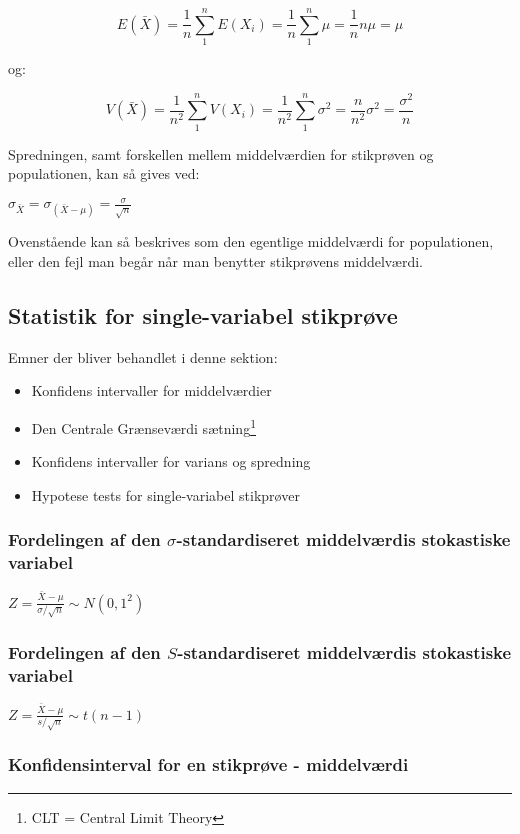 \documentclass{article}
\newcommand{\mellemrum}{\vspace{2 ex}}
\newcommand{\cent}[1]{ \mellemrum \begin{center} #1\end{center} \mellemrum }
\newcommand{\centL}[1]{ \mellemrum \vspace{-20 px} \begin{center} $#1$\end{center} \mellemrum }
\newcommand{\parenthesis}[1]{\ensuremath{\left( #1 \right)}}
\begin{document}
	\centL{$ E(\bar{X}) = \frac{1}{n}\sum_{1}^{n} E(X_i) = \frac{1}{n} \sum_{1}^{n} \mu = \frac{1}{n} n\mu = \mu  $}
	
	og:
	
	\centL{$ V(\bar{X}) = \frac{1}{n^2} \sum_{1}^{n}V(X_i) = \frac{1}{n^2} \sum_{1}^{n} \sigma^2 = \frac{n}{n^2} \sigma^2 = \frac{\sigma^2}{n} $}
	
	Spredningen, samt forskellen mellem middelværdien for stikprøven og populationen, kan så gives ved:
	
	\cent{$\sigma_{\bar{X}} = \sigma_{\parenthesis{\bar{X}-\mu}} = \frac{\sigma}{\sqrt{n}} $}
	
	Ovenstående kan så beskrives som den egentlige middelværdi for populationen, eller den fejl man begår når man benytter stikprøvens middelværdi.
	
	\subsection{Statistik for single-variabel stikprøve}
	
	Emner der bliver behandlet i denne sektion:
	
	\begin{itemize}
		\item Konfidens intervaller for middelværdier
		\item Den Centrale Grænseværdi sætning\footnote{CLT = Central Limit Theory}
		\item Konfidens intervaller for varians og spredning
		\item Hypotese tests for single-variabel stikprøver
	\end{itemize}
	
	\subsubsection{Fordelingen af den $\sigma$-standardiseret middelværdis stokastiske variabel}
	
	\cent{$ Z = \frac{\bar{X} - \mu}{\sigma / \sqrt{n}} \sim N(0,1^2) $}
	
	\subsubsection{Fordelingen af den $S$-standardiseret middelværdis stokastiske variabel}
	
	\cent{$ Z = \frac{\bar{X} - \mu}{s / \sqrt{n}} \sim t(n-1) $}
	
	\subsubsection{Konfidensinterval for en stikprøve - middelværdi}
	
\end{document}
